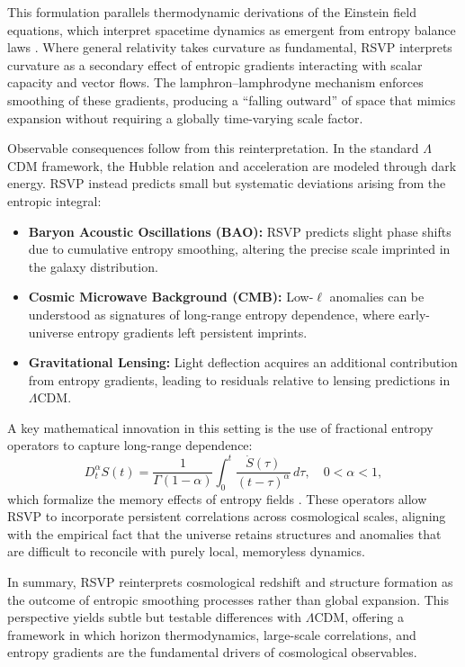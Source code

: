 \documentclass[12pt]{article}
\begin{document}
This formulation parallels thermodynamic derivations of the Einstein field equations, which interpret spacetime dynamics as emergent from entropy balance laws \cite{Jacobson:1995ab}. Where general relativity takes curvature as fundamental, RSVP interprets curvature as a secondary effect of entropic gradients interacting with scalar capacity and vector flows. The lamphron–lamphrodyne mechanism enforces smoothing of these gradients, producing a “falling outward” of space that mimics expansion without requiring a globally time-varying scale factor.  

Observable consequences follow from this reinterpretation. In the standard $\Lambda$CDM framework, the Hubble relation and acceleration are modeled through dark energy. RSVP instead predicts small but systematic deviations arising from the entropic integral:
\begin{itemize}
    \item \textbf{Baryon Acoustic Oscillations (BAO):} RSVP predicts slight phase shifts due to cumulative entropy smoothing, altering the precise scale imprinted in the galaxy distribution.
    \item \textbf{Cosmic Microwave Background (CMB):} Low-$\ell$ anomalies can be understood as signatures of long-range entropy dependence, where early-universe entropy gradients left persistent imprints.
    \item \textbf{Gravitational Lensing:} Light deflection acquires an additional contribution from entropy gradients, leading to residuals relative to lensing predictions in $\Lambda$CDM.
\end{itemize}

A key mathematical innovation in this setting is the use of fractional entropy operators to capture long-range dependence:
\begin{equation}
D_t^\alpha S(t) = \frac{1}{\Gamma(1-\alpha)}\int_0^t \frac{\dot S(\tau)}{(t-\tau)^\alpha}\,d\tau, \quad 0<\alpha<1,
\end{equation}
which formalize the memory effects of entropy fields \cite{Barrow:2020unz}. These operators allow RSVP to incorporate persistent correlations across cosmological scales, aligning with the empirical fact that the universe retains structures and anomalies that are difficult to reconcile with purely local, memoryless dynamics.  

In summary, RSVP reinterprets cosmological redshift and structure formation as the outcome of entropic smoothing processes rather than global expansion. This perspective yields subtle but testable differences with $\Lambda$CDM, offering a framework in which horizon thermodynamics, large-scale correlations, and entropy gradients are the fundamental drivers of cosmological observables.
\end{document}

